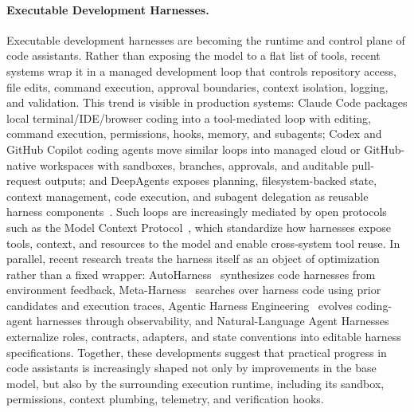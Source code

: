 \paragraph{Executable Development Harnesses.}
Executable development harnesses are becoming the runtime and control plane of
code assistants. Rather than exposing the model to a flat list of tools, recent
systems wrap it in a managed development loop that controls repository access,
file edits, command execution, approval boundaries, context isolation, logging,
and validation. This trend is visible in production systems: Claude Code
packages local terminal/IDE/browser coding into a tool-mediated loop with
editing, command execution, permissions, hooks, memory, and subagents; Codex and
GitHub Copilot coding agents move similar loops into managed cloud or
GitHub-native workspaces with sandboxes, branches, approvals, and auditable
pull-request outputs; and DeepAgents exposes planning, filesystem-backed state,
context management, code execution, and subagent delegation as reusable harness
components~\citep{claudecode2025,codex2025,deepagents2025,copilotagent2025}.
Such loops are increasingly mediated by open protocols such as the Model Context Protocol~\citep{anthropic2024mcp,hou2025model}, 
which standardize how harnesses expose tools, context, and resources to the model and enable cross-system tool reuse. 
In parallel, recent research treats the harness itself as an object of optimization rather than a fixed wrapper: AutoHarness~\citep{lou2026autoharness} synthesizes
code harnesses from environment feedback, Meta-Harness~\citep{lee2026metaharness} searches over harness
code using prior candidates and execution traces, Agentic Harness Engineering~\citep{lin2026agentic}
evolves coding-agent harnesses through observability, and Natural-Language
Agent Harnesses~\citep{pan2026natural} externalize roles, contracts, adapters, and state conventions
into editable harness specifications. Together, these developments suggest that practical progress in code assistants
is increasingly shaped not only by improvements in the base model, but also by
the surrounding execution runtime, including its sandbox, permissions, context
plumbing, telemetry, and verification hooks.

